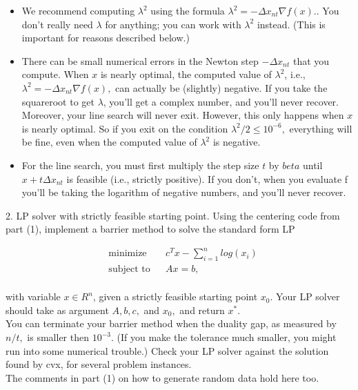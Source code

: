 \documentclass{article}
\begin{document}
\begin{itemize}
	\item We recommend computing $\lambda^2$ using the formula 
	$\lambda ^2 = - \Delta x_{nt} \nabla f(x).$. You don’t
	really need $\lambda$ for anything; you can work with $\lambda^2$ instead. (This is important for
	reasons described below.)
	
	\item There can be small numerical errors in the Newton step $- \Delta x_{nt}$ that you compute.
	When $x$ is nearly optimal, the computed value of $\lambda^2$, i.e., $\lambda ^2 = - \Delta x_{nt} \nabla f(x),$ can
	actually be (slightly) negative. If you take the squareroot to get $\lambda$, you’ll get a
	complex number, and you’ll never recover. Moreover, your line search will never
	exit. However, this only happens when $x$ is nearly optimal. So if you exit on the
	condition $\lambda^2 / 2 \leq 10^{-6},$ everything will be fine, even when the computed value of $\lambda ^2$ is negative.
	
	\item For the line search, you must first multiply the step size $t$ by $beta$ until $x + t \Delta x_{nt}$ is
	feasible (i.e., strictly positive). If you don’t, when you evaluate f you’ll be taking
	the logarithm of negative numbers, and you’ll never recover.
\end{itemize}

2. LP solver with strictly feasible starting point. Using the centering code from part (1),
implement a barrier method to solve the standard form LP

\begin{align*}
	&\text{minimize } && c^T x - \sum_{i = 1}^n log(x_i)\\
	&\text{subject to} && Ax = b,\\
\end{align*}

with variable $x \in R^n$, given a strictly feasible starting point $x_0.$ Your LP solver should
take as argument $A, b, c,$ and $x_0,$ and return $x^*.$ \\

You can terminate your barrier method when the duality gap, as
measured by $n/t,$ is smaller then $10^{-3}.$ (If you make
the tolerance much smaller, you might run into
some numerical trouble.) Check your LP solver against the solution found by cvx, for several problem instances.\\

The comments in part (1) on how to generate random data hold here too.\\
\end{document}
